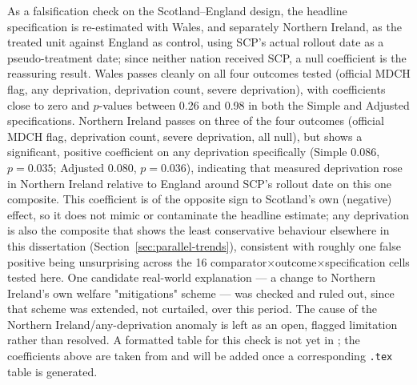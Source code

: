 As a falsification check on the Scotland--England design, the headline specification is re-estimated with Wales, and separately Northern Ireland, as the treated unit against England as control, using SCP's actual rollout date as a pseudo-treatment date; since neither nation received SCP, a null coefficient is the reassuring result. Wales passes cleanly on all four outcomes tested (official MDCH flag, any deprivation, deprivation count, severe deprivation), with coefficients close to zero and $p$-values between 0.26 and 0.98 in both the Simple and Adjusted specifications. Northern Ireland passes on three of the four outcomes (official MDCH flag, deprivation count, severe deprivation, all null), but shows a significant, positive coefficient on any deprivation specifically (Simple $0.086$, $p=0.035$; Adjusted $0.080$, $p=0.036$), indicating that measured deprivation rose in Northern Ireland relative to England around SCP's rollout date on this one composite. This coefficient is of the opposite sign to Scotland's own (negative) effect, so it does not mimic or contaminate the headline estimate; any deprivation is also the composite that shows the least conservative behaviour elsewhere in this dissertation (Section~\ref{sec:parallel-trends}), consistent with roughly one false positive being unsurprising across the 16 comparator$\times$outcome$\times$specification cells tested here. One candidate real-world explanation --- a change to Northern Ireland's own welfare "mitigations" scheme --- was checked and ruled out, since that scheme was extended, not curtailed, over this period. The cause of the Northern Ireland/any-deprivation anomaly is left as an open, flagged limitation rather than resolved. A formatted table for this check is not yet in ; the coefficients above are taken from  and will be added once a corresponding \texttt{.tex} table is generated.
